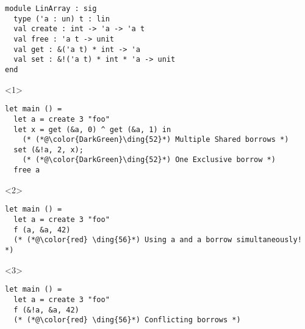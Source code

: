 \documentclass[xcolor=svgnames,11pt]{beamer}
\begin{document}
\begin{frame}[t,fragile]
\begin{lstlisting}
module LinArray : sig
  type ('a : un) t : lin
  val create : int -> 'a -> 'a t
  val free : 'a t -> unit
  val get : &('a t) * int -> 'a
  val set : &!('a t) * int * 'a -> unit
end
\end{lstlisting}

\begin{onlyenv}<1>
\begin{lstlisting}
let main () =
  let a = create 3 "foo"
  let x = get (&a, 0) ^ get (&a, 1) in
    (* (*@\color{DarkGreen}\ding{52}*) Multiple Shared borrows *)
  set (&!a, 2, x);
    (* (*@\color{DarkGreen}\ding{52}*) One Exclusive borrow *)
  free a
\end{lstlisting}
\end{onlyenv}

\begin{onlyenv}<2>
\begin{lstlisting}
let main () =
  let a = create 3 "foo"
  f (a, &a, 42)
  (* (*@\color{red} \ding{56}*) Using a and a borrow simultaneously! *)
\end{lstlisting}
\end{onlyenv}

\begin{onlyenv}<3>
\begin{lstlisting}
let main () =
  let a = create 3 "foo"
  f (&!a, &a, 42)
  (* (*@\color{red} \ding{56}*) Conflicting borrows *)
\end{lstlisting}
\end{onlyenv}

\end{frame}
\end{document}

